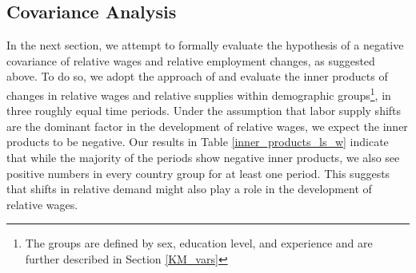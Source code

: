 \documentclass[11pt]{article}
\begin{document}
\subsection{Covariance Analysis}\label{covariance_analysis}

In the next section, we attempt to formally evaluate the hypothesis of a negative covariance of relative wages and relative employment changes, as suggested above. To do so, we adopt the approach of \cite{katz1992changes} and evaluate the inner products of changes in relative wages and relative supplies within demographic groups\footnote{The groups are defined by sex, education level, and experience and are further described in Section \ref{KM_vars}}, in three roughly equal time periods. Under the assumption that labor supply shifts are the dominant factor in the development of relative wages, we expect the inner products to be negative. Our results in Table \ref{inner_products_ls_w} indicate that while the majority of the periods show negative inner products, we also see positive numbers in every country group for at least one period. This suggests that shifts in relative demand might also play a role in the development of relative wages.
\end{document}
